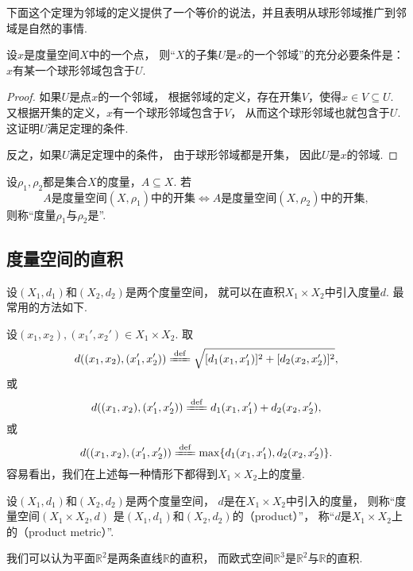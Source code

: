 下面这个定理为邻域的定义提供了一个等价的说法，并且表明从球形邻域推广到邻域是自然的事情.
\begin{theorem}\label{theorem:度量空间.邻域的判定}
设\(x\)是度量空间\(X\)中的一个点，
则“\(X\)的子集\(U\)是\(x\)的一个邻域”的充分必要条件是：
\(x\)有某一个球形邻域包含于\(U\).
\begin{proof}
如果\(U\)是点\(x\)的一个邻域，
根据邻域的定义，存在开集\(V\)，使得\(x \in V \subseteq U\).
又根据开集的定义，\(x\)有一个球形邻域包含于\(V\)，
从而这个球形邻域也就包含于\(U\).
这证明\(U\)满足定理的条件.

反之，如果\(U\)满足定理中的条件，
由于球形邻域都是开集，
因此\(U\)是\(x\)的邻域.
\end{proof}
\end{theorem}

\begin{definition}
设\(\rho_1,\rho_2\)都是集合\(X\)的度量，\(A \subseteq X\).
若\[
	\text{\(A\)是度量空间\((X,\rho_1)\)中的开集}
	\iff
	\text{\(A\)是度量空间\((X,\rho_2)\)中的开集},
\]
则称“度量\(\rho_1\)与\(\rho_2\)是”.
\end{definition}

\subsection{度量空间的直积}
\begingroup
\def\A{X_1}\def\B{X_2}
\def\dA{d_1}\def\dB{d_2}
\def\X{(x_1,x_2)}
\def\Y{(x_1',x_2')}
\def\dAA{d_1(x_1,x_1')}
\def\dBB{d_2(x_2,x_2')}
设\((X_1,d_1)\)和\((X_2,d_2)\)是两个度量空间，
就可以在直积\(X_1 \times X_2\)中引入度量\(d\).
最常用的方法如下.

设\(\X,\Y\in X_1 \times X_2\).
取\[
	d(\X,\Y)
	\defeq
	\sqrt{[\dAA]^2+[\dBB]^2},
\]
或\[
	d(\X,\Y)
	\defeq
	\dAA+\dBB,
\]
或\[
	d(\X,\Y)
	\defeq
	\max\{\dAA,\dBB\}.
\]
容易看出，我们在上述每一种情形下都得到\(X_1 \times X_2\)上的度量.

\begin{definition}
设\((X_1,d_1)\)和\((X_2,d_2)\)是两个度量空间，
\(d\)是在\(X_1 \times X_2\)中引入的度量，
则称“度量空间\((X_1 \times X_2,d)\)
是\((X_1,d_1)\)和\((X_2,d_2)\)的（product）”，
称“\(d\)是\(X_1 \times X_2\)上的（product metric）”.
\end{definition}

\begin{example}
我们可以认为平面\(\mathbb{R}^2\)是两条直线\(\mathbb{R}\)的直积，
而欧式空间\(\mathbb{R}^3\)是\(\mathbb{R}^2\)与\(\mathbb{R}\)的直积.
\end{example}
\endgroup

